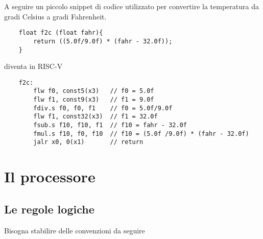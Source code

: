 \documentclass[a4paper,12pt]{article}
\theoremstyle{break}
\numberwithin{equation}{section}
\begin{document}
A seguire un piccolo snippet di codice utilizzato per convertire la temperatura da gradi Celsius a gradi Fahrenheit.
\begin{verbatim}
    float f2c (float fahr){
        return ((5.0f/9.0f) * (fahr - 32.0f));
    }
\end{verbatim}
diventa in RISC-V 
\begin{verbatim}
    f2c:
        flw f0, const5(x3)   // f0 = 5.0f
        flw f1, const9(x3)   // f1 = 9.0f
        fdiv.s f0, f0, f1    // f0 = 5.0f/9.0f
        flw f1, const32(x3)  // f1 = 32.0f
        fsub.s f10, f10, f1  // f10 = fahr - 32.0f
        fmul.s f10, f0, f10  // f10 = (5.0f /9.0f) * (fahr - 32.0f)
        jalr x0, 0(x1)       // return
\end{verbatim}
\section{Il processore}
\subsection{Le regole logiche}
Bisogna stabilire delle convenzioni da seguire 
\end{document}
